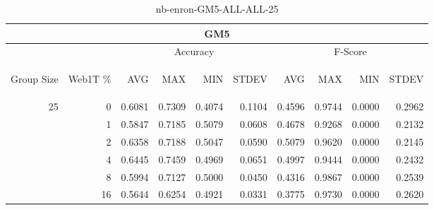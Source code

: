 \begin{center}
\begin{table}[htbp]
\begin{tabular}{ | r | r | r | r | r | r | r | r | r | r |}
\hline
\multicolumn{10}{|c|}{GM5}\\
\hline
 & & \multicolumn{4}{|c|}{Accuracy} & \multicolumn{4}{|c|}{F-Score}\\ \cline{3-10}
\begin{sideways}Group Size\end{sideways} & \begin{sideways}Web1T \%\end{sideways} & \begin{sideways}AVG\end{sideways} & \begin{sideways}MAX\end{sideways} & \begin{sideways}MIN\end{sideways} & \begin{sideways}STDEV\end{sideways} & \begin{sideways}AVG\end{sideways} & \begin{sideways}MAX\end{sideways} & \begin{sideways}MIN\end{sideways} & \begin{sideways}STDEV\end{sideways}\\
\hline
\multirow{5}{*}{25}
 & 0 & 0.6081 & 0.7309 & 0.4074 & 0.1104 & 0.4596 & 0.9744 & 0.0000 & 0.2962\\ \cline{2-10}
 & 1 & 0.5847 & 0.7185 & 0.5079 & 0.0608 & 0.4678 & 0.9268 & 0.0000 & 0.2132\\ \cline{2-10}
 & 2 & 0.6358 & 0.7188 & 0.5047 & 0.0590 & 0.5079 & 0.9620 & 0.0000 & 0.2145\\ \cline{2-10}
 & 4 & 0.6445 & 0.7459 & 0.4969 & 0.0651 & 0.4997 & 0.9444 & 0.0000 & 0.2432\\ \cline{2-10}
 & 8 & 0.5994 & 0.7127 & 0.5000 & 0.0450 & 0.4316 & 0.9867 & 0.0000 & 0.2539\\ \cline{2-10}
 & 16 & 0.5644 & 0.6254 & 0.4921 & 0.0331 & 0.3775 & 0.9730 & 0.0000 & 0.2620\\ \cline{2-10}
\hline
\end{tabular}
\caption{nb-enron-GM5-ALL-ALL-25}
\label{table:nb-enron-GM5-ALL-ALL-25}
\end{table}
\end{center}


